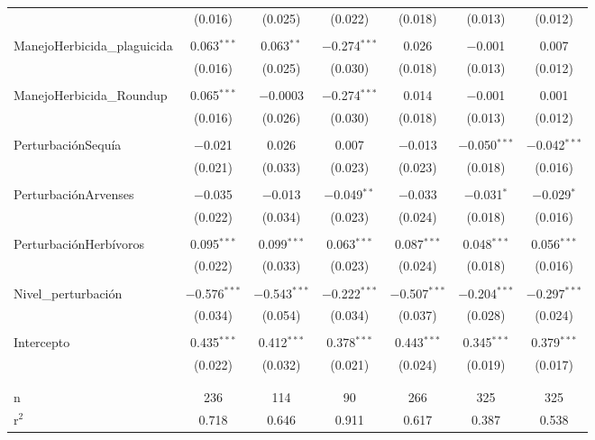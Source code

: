 \documentclass[spanish,11pt]{article}
\begin{document}
\begin{table}[!htbp]
\begin{tabular}{@{\extracolsep{5pt}}lcccccc}
  & (0.016) & (0.025) & (0.022) & (0.018) & (0.013) & (0.012) \\ 
  & & & & & & \\ 
 ManejoHerbicida\_plaguicida & 0.063$^{***}$ & 0.063$^{**}$ & $-$0.274$^{***}$ & 0.026 & $-$0.001 & 0.007 \\ 
  & (0.016) & (0.025) & (0.030) & (0.018) & (0.013) & (0.012) \\ 
  & & & & & & \\ 
 ManejoHerbicida\_Roundup & 0.065$^{***}$ & $-$0.0003 & $-$0.274$^{***}$ & 0.014 & $-$0.001 & 0.001 \\ 
  & (0.016) & (0.026) & (0.030) & (0.018) & (0.013) & (0.012) \\ 
  & & & & & & \\ 
 PerturbaciónSequía & $-$0.021 & 0.026 & 0.007 & $-$0.013 & $-$0.050$^{***}$ & $-$0.042$^{***}$ \\ 
  & (0.021) & (0.033) & (0.023) & (0.023) & (0.018) & (0.016) \\ 
  & & & & & & \\ 
 PerturbaciónArvenses & $-$0.035 & $-$0.013 & $-$0.049$^{**}$ & $-$0.033 & $-$0.031$^{*}$ & $-$0.029$^{*}$ \\ 
  & (0.022) & (0.034) & (0.023) & (0.024) & (0.018) & (0.016) \\ 
  & & & & & & \\ 
 PerturbaciónHerbívoros & 0.095$^{***}$ & 0.099$^{***}$ & 0.063$^{***}$ & 0.087$^{***}$ & 0.048$^{***}$ & 0.056$^{***}$ \\ 
  & (0.022) & (0.033) & (0.023) & (0.024) & (0.018) & (0.016) \\ 
  & & & & & & \\ 
 Nivel\_perturbación & $-$0.576$^{***}$ & $-$0.543$^{***}$ & $-$0.222$^{***}$ & $-$0.507$^{***}$ & $-$0.204$^{***}$ & $-$0.297$^{***}$ \\ 
  & (0.034) & (0.054) & (0.034) & (0.037) & (0.028) & (0.024) \\ 
  & & & & & & \\ 
 Intercepto & 0.435$^{***}$ & 0.412$^{***}$ & 0.378$^{***}$ & 0.443$^{***}$ & 0.345$^{***}$ & 0.379$^{***}$ \\ 
  & (0.022) & (0.032) & (0.021) & (0.024) & (0.019) & (0.017) \\ 
  & & & & & & \\ 
\hline \\[-1.8ex] 
n & 236 & 114 & 90 & 266 & 325 & 325 \\ 
r$^{2}$ & 0.718 & 0.646 & 0.911 & 0.617 & 0.387 & 0.538 \\ 

\end{tabular}
\end{table}
\end{document}
